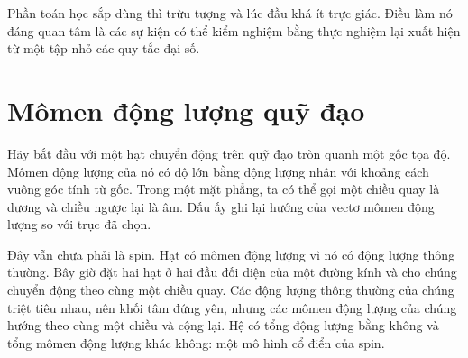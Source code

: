 \begin{classroomqa}
\end{classroomqa}

Phần toán học sắp dùng thì trừu tượng và lúc đầu khá ít trực giác. Điều làm nó đáng quan tâm là các sự kiện có thể kiểm nghiệm bằng thực nghiệm lại xuất hiện từ một tập nhỏ các quy tắc đại số.

\section{Mômen động lượng quỹ đạo}

Hãy bắt đầu với một hạt chuyển động trên quỹ đạo tròn quanh một gốc tọa độ. Mômen động lượng của nó có độ lớn bằng động lượng nhân với khoảng cách vuông góc tính từ gốc. Trong một mặt phẳng, ta có thể gọi một chiều quay là dương và chiều ngược lại là âm. Dấu ấy ghi lại hướng của vectơ mômen động lượng so với trục đã chọn.

Đây vẫn chưa phải là spin. Hạt có mômen động lượng vì nó có động lượng thông thường. Bây giờ đặt hai hạt ở hai đầu đối diện của một đường kính và cho chúng chuyển động theo cùng một chiều quay. Các động lượng thông thường của chúng triệt tiêu nhau, nên khối tâm đứng yên, nhưng các mômen động lượng của chúng hướng theo cùng một chiều và cộng lại. Hệ có tổng động lượng bằng không và tổng mômen động lượng khác không: một mô hình cổ điển của spin.


